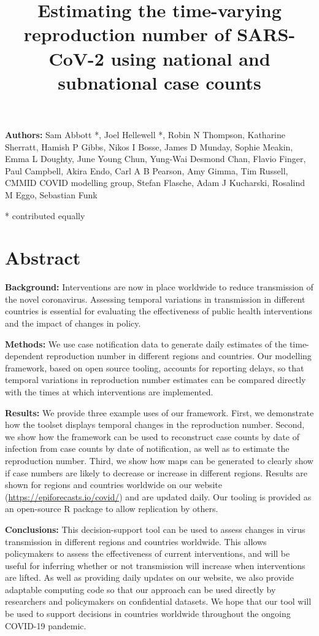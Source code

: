 \documentclass[]{article}
\title{Estimating the time-varying reproduction number of SARS-CoV-2 using
national and subnational case counts}
\author{}
\date{\vspace{-2.5em}}
\begin{document}
\maketitle

\textbf{Authors:} Sam Abbott *, Joel Hellewell *, Robin N Thompson,
Katharine Sherratt, Hamish P Gibbs, Nikos I Bosse, James D Munday,
Sophie Meakin, Emma L Doughty, June Young Chun, Yung-Wai Desmond Chan,
Flavio Finger, Paul Campbell, Akira Endo, Carl A B Pearson, Amy Gimma,
Tim Russell, CMMID COVID modelling group, Stefan Flasche, Adam J
Kucharski, Rosalind M Eggo, Sebastian Funk

* contributed equally

\hypertarget{abstract}{%
\section{Abstract}\label{abstract}}

\textbf{Background:} Interventions are now in place worldwide to reduce
transmission of the novel coronavirus. Assessing temporal variations in
transmission in different countries is essential for evaluating the
effectiveness of public health interventions and the impact of changes
in policy.

\textbf{Methods:} We use case notification data to generate daily
estimates of the time-dependent reproduction number in different regions
and countries. Our modelling framework, based on open source tooling,
accounts for reporting delays, so that temporal variations in
reproduction number estimates can be compared directly with the times at
which interventions are implemented.

\textbf{Results:} We provide three example uses of our framework. First,
we demonstrate how the toolset displays temporal changes in the
reproduction number. Second, we show how the framework can be used to
reconstruct case counts by date of infection from case counts by date of
notification, as well as to estimate the reproduction number. Third, we
show how maps can be generated to clearly show if case numbers are
likely to decrease or increase in different regions. Results are shown
for regions and countries worldwide on our website
(\url{https://epiforecasts.io/covid/}) and are updated daily. Our
tooling is provided as an open-source R package to allow replication by
others.

\textbf{Conclusions:} This decision-support tool can be used to assess
changes in virus transmission in different regions and countries
worldwide. This allows policymakers to assess the effectiveness of
current interventions, and will be useful for inferring whether or not
transmission will increase when interventions are lifted. As well as
providing daily updates on our website, we also provide adaptable
computing code so that our approach can be used directly by researchers
and policymakers on confidential datasets. We hope that our tool will be
used to support decisions in countries worldwide throughout the ongoing
COVID-19 pandemic.
\end{document}
